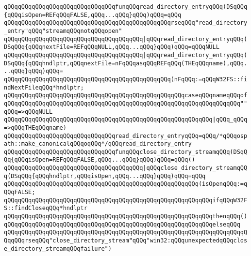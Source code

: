 \newline
\verb|qQQqqQQqqQQqqQQqqQQqqQQqqQQqqQQqfunqQQqread_directory_entryqQQq(DSqQQq{qQQqisOpen=REFqQQqFALSE,qQQq...qQQq}qQQq)qQQq=qQQq|\newline
\verb|qQQqqQQqqQQqqQQqqQQqqQQqqQQqqQQqqQQqqQQqqQQqqQQqrseqQQq"read_directory_entry"qQQq"streamqQQqnotqQQqopen"|\newline
\verb|qQQqqQQqqQQqqQQqqQQqqQQqqQQqqQQqqQQqqQQq|\verb#|qQQqread_directory_entryqQQq(DSqQQq{qQQqnextFile=REFqQQqNULL,qQQq...qQQq}qQQq)qQQq=qQQqNULL#\newline
\verb|qQQqqQQqqQQqqQQqqQQqqQQqqQQqqQQqqQQqqQQq|\verb#|qQQqread_directory_entryqQQq(DSqQQq{qQQqhndlptr,qQQqnextFile=nFqQQqasqQQqREFqQQq(THEqQQqname),qQQq...qQQq}qQQq)qQQq=#\newline
\verb|qQQqqQQqqQQqqQQqqQQqqQQqqQQqqQQqqQQqqQQqqQQqqQQq(nFqQQq:=qQQqW32FS::findNextFileqQQq*hndlptr;|\newline
\verb|qQQqqQQqqQQqqQQqqQQqqQQqqQQqqQQqqQQqqQQqqQQqqQQqqQQqcaseqQQqnameqQQqof|\newline
\verb|qQQqqQQqqQQqqQQqqQQqqQQqqQQqqQQqqQQqqQQqqQQqqQQqqQQqqQQqqQQqqQQqqQQq""qQQq=>qQQqNULL|\newline
\verb|qQQqqQQqqQQqqQQqqQQqqQQqqQQqqQQqqQQqqQQqqQQqqQQqqQQqqQQqqQQq|\verb#|qQQq_qQQq=>qQQqTHEqQQqname)#\newline
\verb|qQQqqQQqqQQqqQQqqQQqqQQqqQQqqQQqread_directory_entryqQQq=qQQq/*qQQqospath::make_canonicalqQQqoqQQq*/qQQqread_directory_entry|\newline
\newline
\verb|qQQqqQQqqQQqqQQqqQQqqQQqqQQqqQQqfunqQQqclose_directory_streamqQQq(DSqQQq{qQQqisOpen=REFqQQqFALSE,qQQq...qQQq}qQQq)qQQq=qQQq()|\newline
\verb|qQQqqQQqqQQqqQQqqQQqqQQqqQQqqQQqqQQqqQQq|\verb#|qQQqclose_directory_streamqQQq(DSqQQq{qQQqhndlptr,qQQqisOpen,qQQq...qQQq}qQQq)qQQq=qQQq#\newline
\verb|qQQqqQQqqQQqqQQqqQQqqQQqqQQqqQQqqQQqqQQqqQQqqQQqqQQqqQQq(isOpenqQQq:=qQQqFALSE;|\newline
\verb|qQQqqQQqqQQqqQQqqQQqqQQqqQQqqQQqqQQqqQQqqQQqqQQqqQQqqQQqqQQqifqQQqW32FS::findCloseqQQq*hndlptr|\newline
\verb|qQQqqQQqqQQqqQQqqQQqqQQqqQQqqQQqqQQqqQQqqQQqqQQqqQQqqQQqqQQqthenqQQq()|\newline
\verb|qQQqqQQqqQQqqQQqqQQqqQQqqQQqqQQqqQQqqQQqqQQqqQQqqQQqqQQqqQQqelseqQQq|\newline
\verb|qQQqqQQqqQQqqQQqqQQqqQQqqQQqqQQqqQQqqQQqqQQqqQQqqQQqqQQqqQQqqQQqqQQqqQQqqQQqrseqQQq"close_directory_stream"qQQq"win32:qQQqunexpectedqQQqclose_directory_streamqQQqfailure")|\newline

